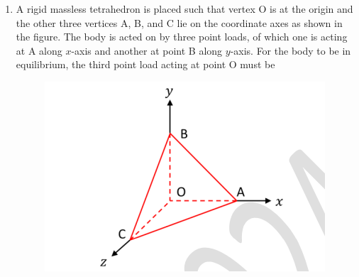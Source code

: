 \documentclass[journal]{IEEEtran}
\begin{document}
\begin{enumerate}[leftmargin=0pt]
\vspace{2mm}

\begin{enumerate}
\end{enumerate}

\hfill{}

\vspace{4mm}

\item
A rigid massless tetrahedron is placed such that vertex O is at the origin and the other three vertices A, B, and C lie on the coordinate axes as shown in the figure. The body is acted on by three point loads, of which one is acting at A along $x$-axis and another at point B along $y$-axis. For the body to be in equilibrium, the third point load acting at point O must be

\begin{figure}[h]
\includegraphics[width=0.45\columnwidth]{Figs/image (69).png}
\caption*{}
\label{fig:q27}
\end{figure}

\vspace{2mm}

\begin{enumerate}
\end{enumerate}


\end{enumerate}
\end{document}
